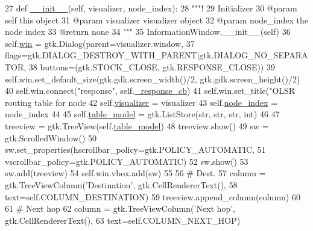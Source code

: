 \begin{DoxyCode}
27     \textcolor{keyword}{def }\hyperlink{classolsr_1_1ShowOlsrRoutingTable_a1177b4090ab65836f8103aa5e87a325d}{\_\_init\_\_}(self, visualizer, node\_index):
28         \textcolor{stringliteral}{"""!}
29 \textcolor{stringliteral}{        Initializer}
30 \textcolor{stringliteral}{        @param self this object}
31 \textcolor{stringliteral}{        @param visualizer visualizer object}
32 \textcolor{stringliteral}{        @param node\_index the node index}
33 \textcolor{stringliteral}{        @return none}
34 \textcolor{stringliteral}{        """}
35         InformationWindow.\_\_init\_\_(self)
36         self.\hyperlink{classolsr_1_1ShowOlsrRoutingTable_a2939f3f7a402c0356634fd0075b990a8}{win} = gtk.Dialog(parent=visualizer.window,
37                               flags=gtk.DIALOG\_DESTROY\_WITH\_PARENT|gtk.DIALOG\_NO\_SEPARATOR,
38                               buttons=(gtk.STOCK\_CLOSE, gtk.RESPONSE\_CLOSE))
39         self.win.set\_default\_size(gtk.gdk.screen\_width()/2, gtk.gdk.screen\_height()/2)
40         self.win.connect(\textcolor{stringliteral}{"response"}, self.\hyperlink{classolsr_1_1ShowOlsrRoutingTable_adb15417bbbe2d97c5d631be3fc673698}{\_response\_cb})
41         self.win.set\_title(\textcolor{stringliteral}{"OLSR routing table for node %
42         self.\hyperlink{classolsr_1_1ShowOlsrRoutingTable_a1ffe99444da97be6a1afe82990d6dd4e}{visualizer} = visualizer
43         self.\hyperlink{classolsr_1_1ShowOlsrRoutingTable_a10f34aed8044599bc9c200ebbbe15dc1}{node\_index} = node\_index
44 
45         self.\hyperlink{classolsr_1_1ShowOlsrRoutingTable_a25e5faeb19a0c3ea176550672831e104}{table\_model} = gtk.ListStore(str, str, str, int)
46 
47         treeview = gtk.TreeView(self.\hyperlink{classolsr_1_1ShowOlsrRoutingTable_a25e5faeb19a0c3ea176550672831e104}{table\_model})
48         treeview.show()
49         sw = gtk.ScrolledWindow()
50         sw.set\_properties(hscrollbar\_policy=gtk.POLICY\_AUTOMATIC,
51                           vscrollbar\_policy=gtk.POLICY\_AUTOMATIC)
52         sw.show()
53         sw.add(treeview)
54         self.win.vbox.add(sw)
55         
56         \textcolor{comment}{# Dest.}
57         column = gtk.TreeViewColumn(\textcolor{stringliteral}{'Destination'}, gtk.CellRendererText(),
58                                     text=self.COLUMN\_DESTINATION)
59         treeview.append\_column(column)
60 
61         \textcolor{comment}{# Next hop}
62         column = gtk.TreeViewColumn(\textcolor{stringliteral}{'Next hop'}, gtk.CellRendererText(),
63                                     text=self.COLUMN\_NEXT\_HOP)
}
\end{DoxyCode}
